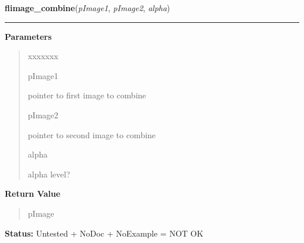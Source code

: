 \hspace{.8\funcindent}\begin{boxedminipage}{\funcwidth}

    \raggedright \textbf{flimage\_combine}(\textit{pImage1}, \textit{pImage2}, \textit{alpha})

    \vspace{-1.5ex}

    \rule{\textwidth}{0.5\fboxrule}
\setlength{\parskip}{2ex}
\setlength{\parskip}{1ex}
      \textbf{Parameters}
      \vspace{-1ex}

      \begin{quote}
        \begin{Ventry}{xxxxxxx}

          \item[pImage1]

          pointer to first image to combine

          \item[pImage2]

          pointer to second image to combine

          \item[alpha]

          alpha level?

        \end{Ventry}

      \end{quote}

      \textbf{Return Value}
    \vspace{-1ex}

      \begin{quote}
      pImage

      \end{quote}

\textbf{Status:} Untested + NoDoc + NoExample = NOT OK



    \end{boxedminipage}

    \label{xformslib:library:flimage_display_markers}

    \vspace{0.5ex}

